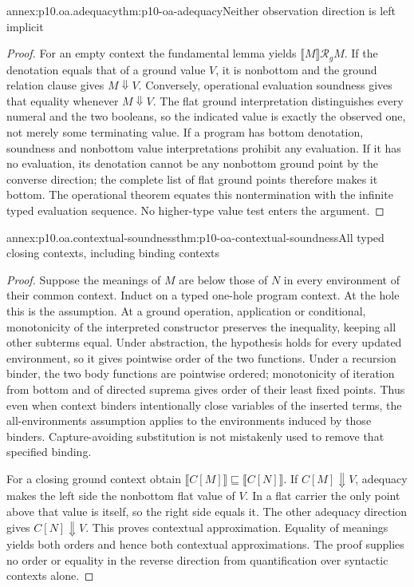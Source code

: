 \begin{annexitem}{annex:p10.oa.adequacy}{thm:p10-oa-adequacy}{Neither observation direction is left implicit}
\begin{proof}
For an empty context the fundamental lemma yields
\(\llbracket M\rrbracket\mathrel{\mathcal R_g}M\).
If the denotation equals that of a ground value \(V\), it is nonbottom
and the ground relation clause gives \(M\Downarrow V\). Conversely,
operational evaluation soundness gives that equality whenever
\(M\Downarrow V\). The flat ground interpretation distinguishes
every numeral and the two booleans, so the indicated value is exactly
the observed one, not merely some terminating value.
If a program has bottom denotation, soundness and nonbottom value
interpretations prohibit any evaluation. If it has no evaluation, its
denotation cannot be any nonbottom ground point by the converse direction;
the complete list of flat ground points therefore makes it bottom.
The operational theorem equates this nontermination with the infinite
typed evaluation sequence. No higher-type value test enters the argument.
\end{proof}
\end{annexitem}

\begin{annexitem}{annex:p10.oa.contextual-soundness}{thm:p10-oa-contextual-soundness}{All typed closing contexts, including binding contexts}
\begin{proof}
Suppose the meanings of \(M\) are below those of \(N\) in every
environment of their common context. Induct on a typed one-hole program
context. At the hole this is the assumption. At a ground operation,
application or conditional, monotonicity of the interpreted constructor
preserves the inequality, keeping all other subterms equal. Under
abstraction, the hypothesis holds for every updated environment, so it
gives pointwise order of the two functions. Under a recursion binder,
the two body functions are pointwise ordered; monotonicity of iteration
from bottom and of directed suprema gives order of their least fixed
points. Thus even when context binders intentionally close variables of
the inserted terms, the all-environments assumption applies to the
environments induced by those binders. Capture-avoiding substitution is
not mistakenly used to remove that specified binding.

For a closing ground context obtain
\(\llbracket C[M]\rrbracket\sqsubseteq\llbracket C[N]\rrbracket\).
If \(C[M]\Downarrow V\), adequacy makes the left side the nonbottom
flat value of \(V\). In a flat carrier the only point above that value
is itself, so the right side equals it. The other adequacy direction
gives \(C[N]\Downarrow V\). This proves contextual approximation.
Equality of meanings yields both orders and hence both contextual
approximations. The proof supplies no order or equality in the reverse
direction from quantification over syntactic contexts alone.
\end{proof}
\end{annexitem}

